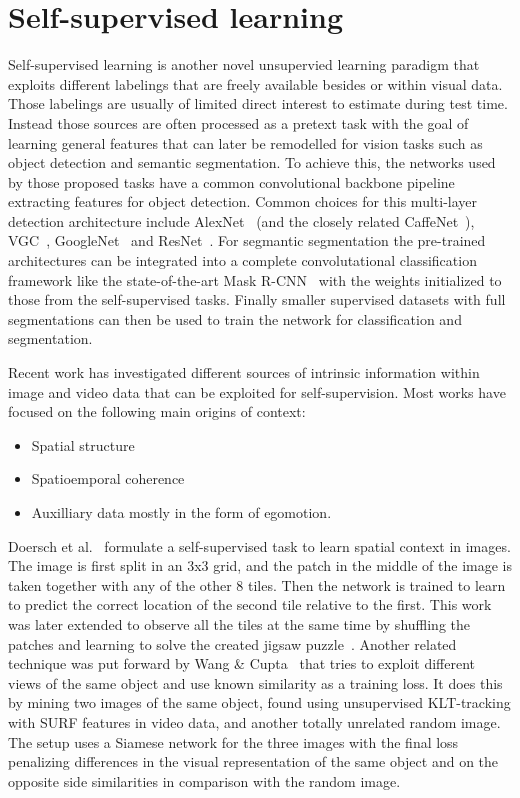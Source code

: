 \section{Self-supervised learning}
Self-supervised learning is another novel unsupervied learning paradigm that exploits different labelings that are freely available besides or within visual data. Those labelings are usually of limited direct interest to estimate during test time. Instead those sources are often processed as a pretext task with the goal of learning general features that can later be remodelled for vision tasks such as object detection and semantic segmentation\needref. To achieve this, the networks used by those proposed tasks have a common convolutional backbone pipeline extracting features for object detection. Common choices for this multi-layer detection architecture include AlexNet~\cite{krizhevsky2012} (and the closely related CaffeNet~\cite{jia2014}), VGC~\cite{simonyan2014}, GoogleNet~\cite{szegedy2015} and ResNet~\cite{he2016}. For segmantic segmentation the pre-trained architectures can be integrated into a complete convolutational classification framework like the state-of-the-art Mask R-CNN~\cite{he2017} with the weights initialized to those from the self-supervised tasks. Finally smaller supervised datasets with full segmentations can then be used to train the network for classification and segmentation.

Recent work has investigated different sources of intrinsic information within image and video data that can be exploited for self-supervision. Most works have focused on the following main origins of context: 
\begin{itemize}
\item Spatial structure
\item Spatioemporal coherence 
\item Auxilliary data mostly in the form of egomotion.
\end{itemize}

Doersch et al.~\cite{doersch2015} formulate a self-supervised task to learn spatial context in images. The image is first split in an 3x3 grid, and the patch in the middle of the image is taken together with any of the other 8 tiles. Then the network is trained to learn to predict the correct location of the second tile relative to the first. This work was later extended to observe all the tiles at the same time by shuffling the patches and learning to solve the created jigsaw puzzle~\cite{noroozi2016}. Another related technique was put forward by Wang \& Cupta~\cite{wang2015} that tries to exploit different views of the same object and use known similarity as a training loss. It does this by mining two images of the same object, found using unsupervised KLT-tracking with SURF features in video data, and another totally unrelated random image. The setup uses a Siamese network for the three images with the final loss penalizing differences in the visual representation of the same object and on the opposite side similarities in comparison with the random image.

